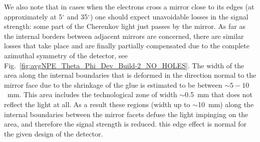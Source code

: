 We also note that in cases when the electrons cross a mirror close to its edges (at approximately at 5$^\circ$ and
35$^\circ$) one should expect unavoidable losses in the signal strength: some part of the Cherenkov light just passes
by the mirror. As far as the internal borders between adjacent mirrors are concerned, there are similar losses that
take place and are finally partially compensated due to the complete azimuthal symmetry of the detector, see
Fig.~\ref{fig:avgNPE_Theta_Phi_Dev_Build-2_NO_HOLES}. The width of the area along the internal boundaries that
is deformed in the direction normal to the mirror face due to the shrinkage of the glue is estimated to be between
$\sim 5 - 10$~mm. This area includes the technological zone of width $\sim$0.5~mm that does not reflect the light at
all. As a result these regions (width up to $\sim$10~mm) along the internal boundaries between the mirror facets
defuse the light impinging on the area, and therefore the signal strength is reduced. this edge effect is normal for
the given design of the detector.
